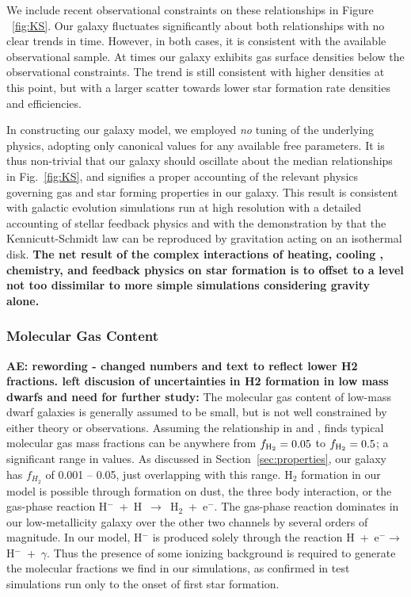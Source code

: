 \documentclass[fleqn,usenatbib,useAMS]{mnras}
\begin{document}
We include recent observational constraints on these relationships in Figure ~\ref{fig:KS}. Our galaxy fluctuates significantly about both relationships with no clear trends in time. However, in both cases, it is consistent with the available observational sample. At times our galaxy exhibits gas surface densities below the observational constraints. The trend is still consistent with higher densities at this point, but with a larger scatter towards lower star formation rate densities and efficiencies.

In constructing our galaxy model, we employed \textit{no} tuning of the underlying physics, adopting only canonical values for any available free parameters. It is thus non-trivial that our galaxy should oscillate about the median relationships in Fig.~\ref{fig:KS}, and signifies a proper accounting of the relevant physics governing gas and star forming properties in our galaxy. This result is consistent with galactic evolution simulations run at high resolution with a detailed accounting of stellar feedback physics \citep[see ][ and references therein]{NaabOstriker2017} and with the demonstration by \citet{Li2005} that the Kennicutt-Schmidt law can be reproduced by gravitation acting on an isothermal disk. \textbf{The net result of the complex interactions of heating, cooling , chemistry, and feedback physics on star formation is to offset to a level not too dissimilar to more simple simulations considering gravity alone.} %

\subsubsection{Molecular Gas Content}
\label{sec:molecular gas content}
\textbf{AE: rewording - changed numbers and text to reflect lower H2 fractions. left discusion of uncertainties in H2 formation in low mass dwarfs and need for further study:}
The molecular gas content of low-mass dwarf galaxies is generally assumed
to be small, but is not well constrained by either theory or observations. Assuming the relationship in \citet{Leroy2013} and \citet{Momose2013}, \citet{Roychowdhury2014} finds typical molecular gas mass fractions can be anywhere from $f_{\rm H_2} = 0.05$ to $f_{\rm H_2} = 0.5$; a significant range in values. As discussed in Section~\ref{sec:properties}, our galaxy has $f_{H_2}$ of 0.001 -- 0.05, just overlapping with this range. H$_2$ formation in our model is possible through formation on dust, the three body interaction, or the gas-phase reaction H$^-$~+~H~$\rightarrow$~H$_2$~+~e$^{-}$. The gas-phase reaction dominates in our low-metallicity galaxy over the other two channels by several orders of magnitude. In our model, H$^{-}$ is produced solely through the reaction H~+~e$^{-} \rightarrow$ H$^{-}$~+~$\gamma$. Thus the presence of some ionizing background is required to generate the molecular fractions we find in our simulations, as confirmed in test simulations run only to the onset of first star formation.
\end{document}
